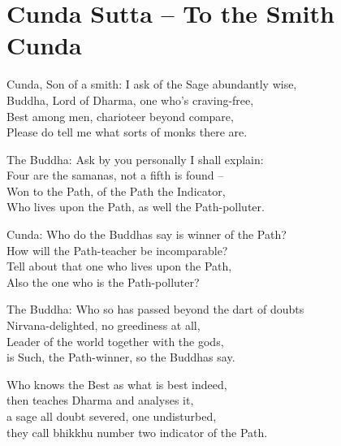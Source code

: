    
    
\chapter{Cunda Sutta -- To the Smith Cunda}

\begin{MyDescription}{Cunda, Son of a smith:}
I ask of the Sage abundantly wise,\\
Buddha, Lord of Dharma, one who's craving-free,\\
Best among men, charioteer beyond compare,\\
Please do tell me what sorts of monks there are.
\end{MyDescription}
   
\begin{MyDescription}{The Buddha:}
Ask by you personally I shall explain:\\
Four are the samanas, not a fifth is found – \\
Won to the Path, of the Path the Indicator,\\
Who lives upon the Path, as well the Path-polluter.
\end{MyDescription}
  
\begin{MyDescription}{Cunda:}
Who do the Buddhas say is winner of the Path?\\
How will the Path-teacher be incomparable?\\
Tell about that one who lives upon the Path,\\
Also the one who is the Path-polluter?
\end{MyDescription}
   
\begin{MyDescription}{The Buddha:}
Who so has passed beyond the dart of doubts\\
Nirvana-delighted, no greediness at all,\\
Leader of the world together with the gods,\\
is Such, the Path-winner, so the Buddhas say.
\end{MyDescription}
   
\begin{MyDescription}{}
Who knows the Best as what is best indeed,\\
then teaches Dharma and analyses it,\\
a sage all doubt severed, one undisturbed,\\
they call bhikkhu number two indicator of the Path.
\end{MyDescription}
   
